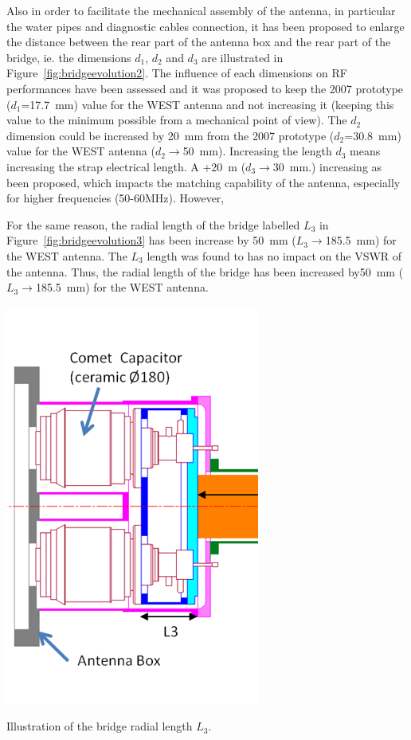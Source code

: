 {Also in order to facilitate the mechanical assembly of the antenna, in particular the water pipes and diagnostic cables connection, it has been proposed to enlarge the distance between the rear part of the antenna box and the rear part of the bridge, ie. the dimensions $d_1$, $d_2$ and $d_3$ are illustrated in Figure~\ref{fig:bridgeevolution2}. The influence of each dimensions on RF performances have been assessed and it was proposed to keep the 2007 prototype ($d_1$=17.7~mm) value for the WEST antenna and not increasing it (keeping this value to the minimum possible from a mechanical point of view). The $d_2$ dimension could be increased by 20~mm from the 2007 prototype ($d_2$=30.8~mm) value for the WEST antenna ($d_2\to$50~mm). Increasing the length $d_3$ means increasing the strap electrical length. A +20~m ($d_3\to$30~mm.) increasing as been proposed, which impacts the matching capability of the antenna, especially for higher frequencies (50-60MHz). However, 

For the same reason, the radial length of the bridge labelled $L_3$ in Figure~\ref{fig:bridgeevolution3} has been increase by 50~mm ($L_3\to $185.5~mm) for the WEST antenna. The $L_3$ length was found to has no impact on the VSWR of the antenna. Thus, the radial length of the bridge has been increased by50~mm ($L_3\to$185.5~mm) for the WEST antenna.

\begin{marginfigure}
	\centering
	\includegraphics[width=0.8\linewidth]{figures/chap3/WEST_ICRH/bridge_evolution3}
	\caption{Illustration of the bridge radial length $L_3$.}
	\label{fig:bridgeevolution3}
\end{marginfigure}

}
